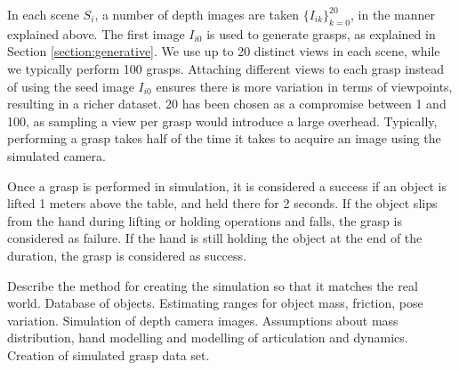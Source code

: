 In each scene $S_i$, a number of depth images are taken $\{I_{ik}\}_{k=0}^20$, in the manner explained above. The first image $I_{i0}$ is used to generate grasps, as explained in Section \ref{section:generative}. We use up to 20 distinct views in each scene, while we typically perform 100 grasps. Attaching different views to each grasp instead of using the seed image $I_{i0}$ ensures there is more variation in terms of viewpoints, resulting in a richer dataset. 20 has been chosen as a compromise between 1 and 100, as sampling a view per grasp would introduce a large overhead. Typically, performing a grasp takes half of the time it takes to acquire an image using the simulated camera.

Once a grasp is performed in simulation, it is considered a success if an object is lifted 1 meters above the table, and held there for 2 seconds. If the object slips from the hand during lifting or holding operations and falls, the grasp is considered as failure. If the hand is still holding the object at the end of the duration, the grasp is considered as success. 

Describe the method for creating the simulation so that it matches the real world. Database of objects. Estimating ranges for object mass, friction, pose variation. Simulation of depth camera images. Assumptions about mass distribution, hand modelling and modelling of articulation and dynamics. Creation of simulated grasp data set.